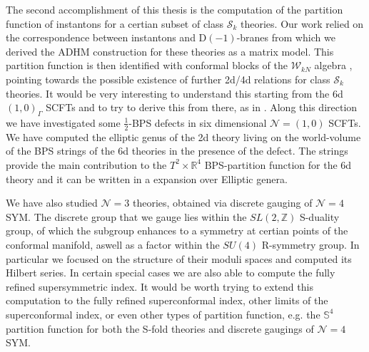 \documentclass[main.tex]{subfiles}
\begin{document}
The second accomplishment of this thesis is the computation of the partition function of instantons for a certian subset of class $\mathcal{S}_k$ theories. Our work relied on the correspondence between instantons and D$(-1)$-branes from which we derived the ADHM construction for these theories as a matrix model. This partition function is then identified with conformal blocks of the $\mathcal{W}_{kN}$ algebra \cite{Mitev:2017jqj}, pointing towards the possible existence of further 2d/4d relations for class $\mathcal{S}_k$ theories. It would be very interesting to understand this starting from the 6d $(1,0)_{\Gamma}$ SCFTs and to try to derive this from there, as in \cite{Cordova:2016cmu}. Along this direction we have investigated some $\frac{1}{2}$-BPS defects in six dimensional $\mathcal{N}=(1,0)$ SCFTs. We have computed the elliptic genus of the 2d theory living on the world-volume of the BPS strings of the 6d theories in the presence of the defect. The strings provide the main contribution to the $T^2\times\mathbb{R}^4$ BPS-partition function for the 6d theory and it can be written in a expansion over Elliptic genera.

We have also studied $\mathcal{N}=3$ theories, obtained via discrete gauging of $\mathcal{N}=4$ SYM. The discrete group that we gauge lies within the $SL(2,\mathbb{Z})$ S-duality group, of which the subgroup enhances to a symmetry at certian points of the conformal manifold, aswell as a factor within the $SU(4)$ R-symmetry group. In particular we focused on the structure of their moduli spaces and computed its Hilbert series. In certain special cases we are also able to compute the fully refined supersymmetric index. It would be worth trying to extend this computation to the fully refined superconformal index, other limits of the superconformal index, or even other types of partition function, e.g. the $\mathbb{S}^4$ partition function for both the S-fold theories and discrete gaugings of $\mathcal{N}=4$ SYM.
\end{document}
